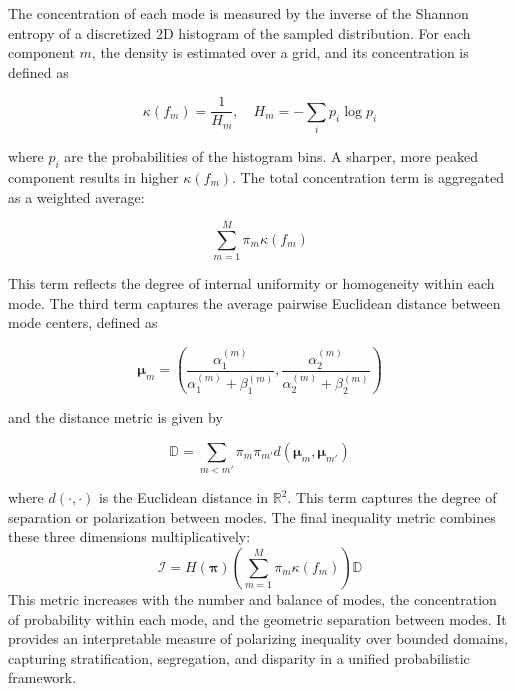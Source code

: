 \documentclass[11pt]{article}
\begin{document}
The concentration of each mode is measured by the inverse of the Shannon entropy of a discretized 2D histogram of the sampled distribution. For each component $m$, the density is estimated over a grid, and its concentration is defined as

$$
\kappa(f_m) = \frac{1}{H_m}, \quad H_m = -\sum_i p_i \log p_i
$$

where $p_i$ are the probabilities of the histogram bins. A sharper, more peaked component results in higher $\kappa(f_m)$. The total concentration term is aggregated as a weighted average:

$$
\sum_{m=1}^{M} \pi_m  \kappa(f_m)
$$

This term reflects the degree of internal uniformity or homogeneity within each mode. The third term captures the average pairwise Euclidean distance between mode centers, defined as

$$
\boldsymbol{\mu}_m = \left( \frac{\alpha_1^{(m)}}{\alpha_1^{(m)} + \beta_1^{(m)}}, \frac{\alpha_2^{(m)}}{\alpha_2^{(m)} + \beta_2^{(m)}} \right)
$$

and the distance metric is given by

$$
\mathbb{D} = \sum_{m < m'} \pi_m \pi_{m'} d(\boldsymbol{\mu}_m, \boldsymbol{\mu}_{m'})
$$

where $d(\cdot, \cdot)$ is the Euclidean distance in $\mathbb{R}^2$. This term captures the degree of separation or polarization between modes. The final inequality metric combines these three dimensions multiplicatively:
$$
\mathcal{I} = H(\boldsymbol{\pi}) \left( \sum_{m=1}^{M} \pi_m \kappa(f_m) \right) \mathbb{D}
$$
This metric increases with the number and balance of modes, the concentration of probability within each mode, and the geometric separation between modes. It provides an interpretable measure of polarizing inequality over bounded domains, capturing stratification, segregation, and disparity in a unified probabilistic framework.
\end{document}
